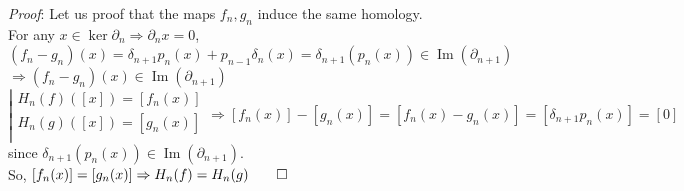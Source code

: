 \documentclass[11pt,a4paper]{report}
\DeclareMathOperator{\Ima}{Im}
\begin{document}
        \emph{Proof}: Let us proof that the maps $f_n, g_n$ induce the same homology.\\
        For any $x \in \ker\partial_n \Rightarrow \partial_nx = 0$, \\
        $(f_n - g_n)(x) = \delta_{n+1}p_n(x) + p_{n-1}\delta_n(x) = \delta_{n+1}(p_n(x)) \in \Ima(\partial_{n+1})$ \\
        $\Rightarrow (f_n - g_n)(x) \in \Ima(\partial_{n+1})$
            \[
				\left|
				  \begin{array}{l}
				  	H_n(f) ([x]) = [f_n(x)] \\
				  	H_n(g) ([x]) = [g_n(x)] \\
				  \end{array} \Rightarrow [f_n(x)] - [g_n(x)] = [f_n(x) - g_n(x)] = [\delta_{n+1}p_n(x)] = [0]
				\right.
			\]
			since $\delta_{n+1}(p_n(x)) \in \Ima(\partial_{n+1})$. \\
			So, $[f_n(x)] = [g_n(x)] \Rightarrow H_n(f) = H_n(g) \qed$ \\
\end{document}
